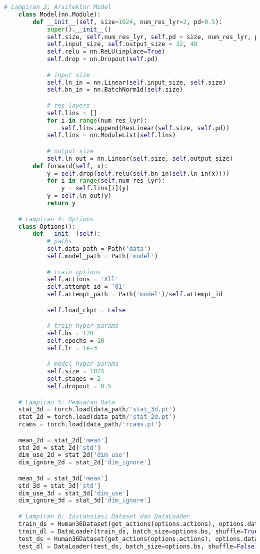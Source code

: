 \begin{lstlisting}[language=Python,multicols=2,basicstyle=\scriptsize\mdseries,breaklines=true]
    # Lampiran 3: Arsitektur Model
    class Model(nn.Module):
        def __init__(self, size=1024, num_res_lyr=2, pd=0.5):
            super().__init__()
            self.size, self.num_res_lyr, self.pd = size, num_res_lyr, pd
            self.input_size, self.output_size = 32, 48
            self.relu = nn.ReLU(inplace=True)
            self.drop = nn.Dropout(self.pd)

            # input size
            self.ln_in = nn.Linear(self.input_size, self.size)
            self.bn_in = nn.BatchNorm1d(self.size)

            # res layers
            self.lins = []
            for i in range(num_res_lyr):
                self.lins.append(ResLinear(self.size, self.pd))
            self.lins = nn.ModuleList(self.lins)

            # output size
            self.ln_out = nn.Linear(self.size, self.output_size)
        def forward(self, x):
            y = self.drop(self.relu(self.bn_in(self.ln_in(x))))
            for i in range(self.num_res_lyr):
                y = self.lins[i](y)
            y = self.ln_out(y)
            return y

    # Lampiran 4: Options
    class Options():
        def __init__(self):
            # paths
            self.data_path = Path('data')
            self.model_path = Path('model')

            # train options
            self.actions = 'All'
            self.attempt_id = '01'
            self.attempt_path = Path('model')/self.attempt_id

            self.load_ckpt = False

            # train hyper-params
            self.bs = 128
            self.epochs = 10
            self.lr = 1e-3

            # model hyper-params
            self.size = 1024
            self.stages = 2
            self.dropout = 0.5

    # Lampiran 5: Pemuatan Data
    stat_3d = torch.load(data_path/'stat_3d.pt')
    stat_2d = torch.load(data_path/'stat_2d.pt')
    rcams = torch.load(data_path/'rcams.pt')

    mean_2d = stat_2d['mean']
    std_2d = stat_2d['std']
    dim_use_2d = stat_2d['dim_use']
    dim_ignore_2d = stat_2d['dim_ignore']

    mean_3d = stat_3d['mean']
    std_3d = stat_3d['std']
    dim_use_3d = stat_3d['dim_use']
    dim_ignore_3d = stat_3d['dim_ignore']

    # Lampiran 6: Instansiasi Dataset dan DataLoader
    train_ds = Human36Dataset(get_actions(options.actions), options.data_path, is_train=True)
    train_dl = DataLoader(train_ds, batch_size=options.bs, shuffle=True)
    test_ds = Human36Dataset(get_actions(options.actions), options.data_path, is_train=False)
    test_dl = DataLoader(test_ds, batch_size=options.bs, shuffle=False)


\end{lstlisting}
